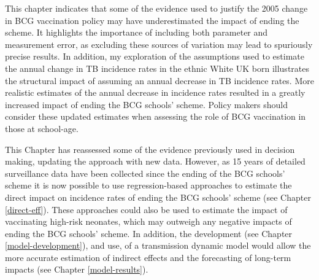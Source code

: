 \documentclass[11pt,twoside]{bristolthesis}
\begin{document}
  This chapter indicates that some of the evidence used to justify the 2005 change in BCG vaccination policy may have underestimated the impact of ending the scheme. It highlights the importance of including both parameter and measurement error, as excluding these sources of variation may lead to spuriously precise results. In addition, my exploration of the assumptions used to estimate the annual change in TB incidence rates in the ethnic White UK born illustrates the structural impact of assuming an annual decrease in TB incidence rates. More realistic estimates of the annual decrease in incidence rates resulted in a greatly increased impact of ending the BCG schools' scheme. Policy makers should consider these updated estimates when assessing the role of BCG vaccination in those at school-age.
  
  This Chapter has reassessed some of the evidence previously used in decision making, updating the approach with new data. However, as 15 years of detailed surveillance data have been collected since the ending of the BCG schools' scheme it is now possible to use regression-based approaches to estimate the direct impact on incidence rates of ending the BCG schools' scheme (see Chapter \ref{direct-eff}). These approaches could also be used to estimate the impact of vaccinating high-risk neonates, which may outweigh any negative impacts of ending the BCG schools' scheme. In addition, the development (see Chapter \ref{model-development}), and use, of a transmission dynamic model would allow the more accurate estimation of indirect effects and the forecasting of long-term impacts (see Chapter \ref{model-results}).
  
\end{document}
